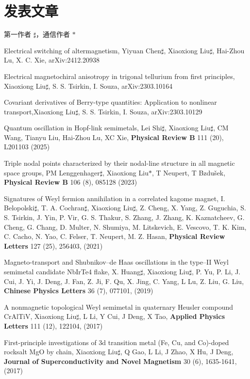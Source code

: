 \documentclass[11pt,a4paper,sans]{moderncv} %
\begin{document}
\section{发表文章}
第一作者 $\sharp$，通信作者 $*$
\begin{etaremune}

  \item Electrical switching of altermagnetism, Yiyuan Chen$\sharp$, \textcolor{cvblue}{Xiaoxiong Liu$\sharp$}, Hai-Zhou Lu, X. C. Xie,  arXiv:2412.20938
  
  \item Electrical magnetochiral anisotropy in trigonal tellurium from first principles, \textcolor{cvblue}{Xiaoxiong Liu$\sharp$}, S. S. Tsirkin, I. Souza, arXiv:2303.10164
  
  \item Covariant derivatives of Berry-type quantities: Application to nonlinear transport,\textcolor{cvblue}{Xiaoxiong Liu$\sharp$}, S. S. Tsirkin, I. Souza, arXiv:2303.10129

  \item Quantum oscillation in Hopf-link semimetals, Lei Shi$\sharp$, \textcolor{cvblue}{Xiaoxiong Liu$\sharp$}, CM Wang, Tianyu Liu, Hai-Zhou Lu, XC Xie, \textbf{Physical Review B} 111 (20), L201103 (2025)
  
  \item Triple nodal points characterized by their nodal-line structure in all magnetic space groups, PM Lenggenhager$\sharp$, \textcolor{cvblue}{Xiaoxiong Liu$*$}, T Neupert, T Bzdušek, \textbf{Physical Review B} 106 (8), 085128 (2023)
  
   \item Signatures of Weyl fermion annihilation in a correlated kagome magnet, I. Belopolski$\sharp$, T. A. Cochran$\sharp$, \textcolor{cvblue}{Xiaoxiong Liu$\sharp$}, Z. Cheng, X. Yang, Z. Guguchia, S. S. Tsirkin, J. Yin, P. Vir, G. S. Thakur, S. Zhang, J. Zhang, K. Kaznatcheev, G. Cheng, G. Chang, D. Multer, N. Shumiya, M. Litskevich, E. Vescovo, T. K. Kim, C. Cacho, N. Yao, C. Felser, T. Neupert, M. Z. Hasan, \textbf{Physical Review Letters} 127 (25), 256403, (2021)
   
   \item Magneto-transport and Shubnikov–de Haas oscillations in the type–II Weyl semimetal candidate NbIrTe4 flake, X. Huang$\sharp$, \textcolor{cvblue}{Xiaoxiong Liu$\sharp$}, P. Yu, P. Li, J. Cui, J. Yi, J. Deng, J. Fan, Z. Ji, F. Qu, X. Jing, C. Yang, L Lu, Z. Liu, G. Liu, \textbf{Chinese Physics Letters} 36 (7), 077101, (2019)

  \item A nonmagnetic topological Weyl semimetal in quaternary Heusler compound CrAlTiV, \textcolor{cvblue}{Xiaoxiong Liu$\sharp$}, L Li, Y Cui, J Deng, X Tao, \textbf{Applied Physics Letters} 111 (12), 122104, (2017)
   
   \item First-principle investigations of 3d transition metal (Fe, Cu, and Co)-doped rocksalt MgO by chain, \textcolor{cvblue}{Xiaoxiong Liu$\sharp$}, Q Gao, L Li, J Zhao, X Hu, J Deng, \textbf{Journal of Superconductivity and Novel Magnetism} 30 (6), 1635-1641, (2017)
  
\end{etaremune}  
\end{document}
